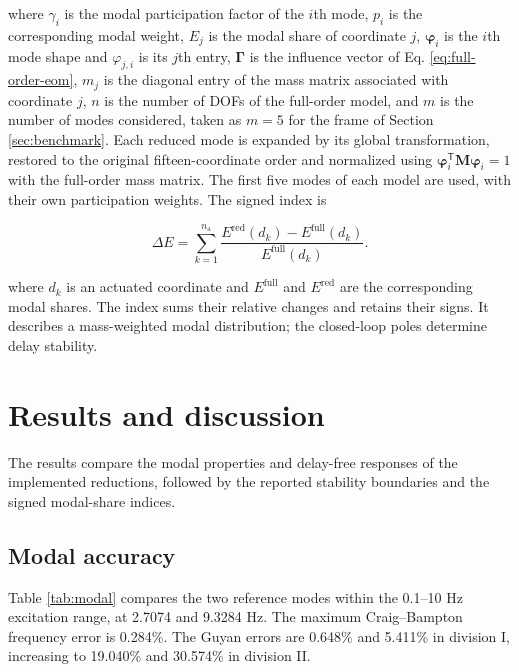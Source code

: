 \documentclass[a4paper,fleqn,review,12pt]{cas-sc}
\numberwithin{equation}{section}
\newcommand{\rev}[1]{{\color{red}#1}}
\begin{document}
\noindent where \(\gamma_{i}\) is the modal participation factor of the \(i\)th mode, \(p_{i}\) is the corresponding modal weight, \(E_{j}\) is the modal share of coordinate \(j\), \(\bm{\varphi}_{i}\) is the \(i\)th mode shape and \(\varphi_{j,i}\) is its \(j\)th entry, \(\bm{\Gamma}\) is the influence vector of Eq. \eqref{eq:full-order-eom}, \(m_{j}\) is the diagonal entry of the mass matrix associated with coordinate \(j\), \(n\) is the number of DOFs of the full-order model, and \(m\) is the number of modes considered, taken as \(m=5\) for the frame of Section \ref{sec:benchmark}. \rev{Each reduced mode is expanded by its global transformation, restored to the original fifteen-coordinate order and normalized using \(\bm\varphi_i^{\mathsf T}\mathbf M\bm\varphi_i=1\) with the full-order mass matrix. The first five modes of each model are used, with their own participation weights. The signed index is}

\begin{equation}
	\Delta E=\sum_{k=1}^{n_{\mathrm{a}}}
	\frac{E^{\mathrm{red}}(d_{k})-E^{\mathrm{full}}(d_{k})}{E^{\mathrm{full}}(d_{k})}.
	\label{eq:energy-change}
\end{equation}

\rev{\noindent where \(d_k\) is an actuated coordinate and \(E^{\mathrm{full}}\) and \(E^{\mathrm{red}}\) are the corresponding modal shares. The index sums their relative changes and retains their signs. It describes a mass-weighted modal distribution; the closed-loop poles determine delay stability.}




\section{Results and discussion} \label{sec5}

\rev{The results compare the modal properties and delay-free responses of the implemented reductions, followed by the reported stability boundaries and the signed modal-share indices.}

\subsection{Modal accuracy}
\label{sec:modal-accuracy}

\rev{Table \ref{tab:modal} compares the two reference modes within the 0.1--10 Hz excitation range, at 2.7074 and 9.3284 Hz. The maximum Craig--Bampton frequency error is 0.284\%. The Guyan errors are 0.648\% and 5.411\% in division I, increasing to 19.040\% and 30.574\% in division II.}
\end{document}

